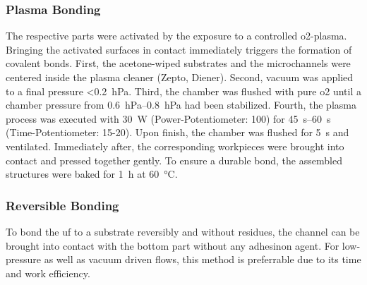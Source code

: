 \subsubsection{Plasma Bonding}
\label{sec:meth:bond:plasma}
The respective parts were activated by the exposure to a controlled \gls{o2}-plasma. Bringing the activated surfaces in contact immediately triggers the formation of covalent bonds. First, the acetone-wiped substrates and the microchannels were centered inside the plasma cleaner (Zepto, Diener). Second, vacuum was applied to a final pressure <\SI{0.2}{\hecto\pascal}. Third, the chamber was flushed with pure \gls{o2} until a chamber pressure from \SIrange{0.6}{0.8}{\hecto\pascal} had been stabilized. Fourth, the plasma process was executed with \SI{30}{\watt} (Power-Potentiometer: 100) for \SIrange{45}{60}{\second} (Time-Potentiometer: 15-20). Upon finish, the chamber was flushed for \SI{5}{\second} and ventilated. Immediately after, the corresponding workpieces were brought into contact and pressed together gently. To ensure a durable bond, the assembled structures were baked for \SI{1}{\hour} at \SI{60}{\degreeCelsius}.

\subsubsection{Reversible Bonding}
To bond the \gls{uf} to a substrate reversibly and without residues, the channel can be brought into contact with the bottom part without any adhesinon agent. For low-pressure as well as vacuum driven flows, this method is preferrable due to its time and work efficiency.

